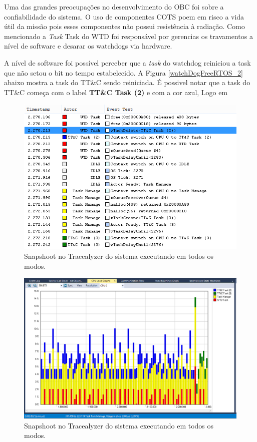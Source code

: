 Uma das grandes preocupações no desenvolvimento do OBC foi sobre a confiabilidade do sistema. O uso de componentes COTS poem em risco a vida útil da missão pois esses componentes não possui resistência à radiação. Como mencionado a \textit{Task} Task do WTD foi responsável por gerencias os travamentos a nível de software e desarar os watchdogs via hardware.

A nível de software foi possível perceber que a \textit{task} do watchdog reiniciou a task que não setou o bit no tempo estabelecido. A Figura \ref{watchDogFreeRTOS_2} abaixo mostra a task do TT\&C sendo reiniciada. É possivel notar que a task do TT\&C começa com o label \textbf{TT\&C Task (2)} e com a cor azul, Logo em

\begin{figure}[h]
	\centering
	\caption{Snapshoot no Tracealyzer do sistema executando em todos os modos.}
	\includegraphics[keepaspectratio=true,scale=0.51]{figuras/watchDogFreeRTOS_2.PNG}
	
	\label{watchDogFreeRTOS_1}
\end{figure}

\begin{figure}[h]
	\centering
	\caption{Snapshoot no Tracealyzer do sistema executando em todos os modos.}
	\includegraphics[keepaspectratio=true,scale=0.51]{figuras/watchDogFreeRTOS.PNG}
	
	\label{watchDogFreeRTOS}
\end{figure}


